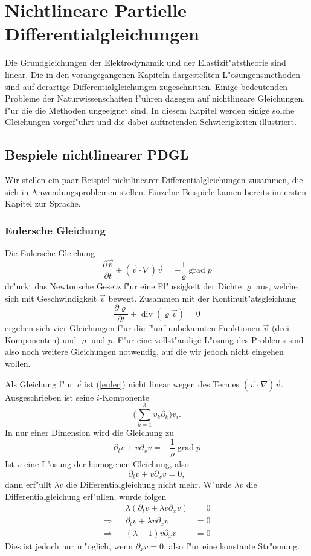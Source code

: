 %
%
%
\chapter{Nichtlineare Partielle Differentialgleichungen\label{chapter-nichtlinear}}
\rhead{}
Die Grundgleichungen der Elektrodynamik und der Elastizit"atstheorie
sind linear. Die in den vorangegangenen Kapiteln dargestellten
L"osungensmethoden sind auf derartige Differentialgleichungen
zugeschnitten. Einige bedeutenden Probleme der Naturwissenschaften
f"uhren dagegen auf nichtlineare Gleichungen, f"ur die die
Methoden ungeeignet sind. In diesem Kapitel werden einige
solche Gleichungen vorgef"uhrt und die dabei auftretenden
Schwierigkeiten illustriert.

\section{Bespiele nichtlinearer PDGL}
Wir stellen ein paar Beispiel nichtlinearer Differentialgleichungen
zusammen, die sich in Anwendungsproblemen stellen. Einzelne Beispiele
kamen bereits im ersten Kapitel zur Sprache.

\subsection{Eulersche Gleichung}
Die Eulersche Gleichung
\begin{equation}
\frac{\partial \vec v}{\partial t}+(\vec v\cdot\nabla)\vec v=-\frac1\varrho\operatorname{grad}p
\label{euler}
\end{equation}
dr"uckt das Newtonsche Gesetz f"ur eine Fl"ussigkeit der Dichte $\varrho$ aus,
welche sich mit Geschwindigkeit $\vec v$ bewegt.
Zusammen mit der Kontinuit"atsgleichung
\[
\frac{\partial\varrho}{\partial t}+\operatorname{div}(\varrho \vec v)=0
\]
ergeben sich vier Gleichungen f"ur die f"unf unbekannten Funktionen
$\vec v$ (drei Komponenten) und $\varrho$ und $p$. F"ur eine vollst"andige
L"osung des Problems sind also noch weitere Gleichungen notwendig, auf die
wir jedoch nicht eingehen wollen.

Als Gleichung f"ur $\vec v$ ist (\ref{euler}) nicht linear wegen des Termes
$(\vec v\cdot \nabla)\vec v$. Ausgeschrieben ist seine $i$-Komponente
\[
\biggl(\sum_{k=1}^3v_k\partial_k\biggr)v_i.
\]
In nur einer Dimension wird die Gleichung zu
\[
\partial_tv+v\partial_xv=-\frac1\varrho\operatorname{grad}p
\]
Ist $v$ eine L"osung der homogenen Gleichung, also
\[
\partial_t v+v\partial_x v=0,
\]
dann erf"ullt $\lambda v$ die Differentialgleichung nicht mehr. W"urde
$\lambda v$ die Differentialgleichung erf"ullen, wurde folgen
\begin{align*}
&&\lambda(\partial_t v+\lambda v\partial_xv)&=0
\\
\Rightarrow
&&
\partial_t v+\lambda v\partial_xv&=0
\\
\Rightarrow
&&
(\lambda -1)v\partial_xv&=0
\end{align*}
Dies ist jedoch nur m"oglich, wenn $\partial_xv=0$, also f"ur eine
konstante Str"omung.


